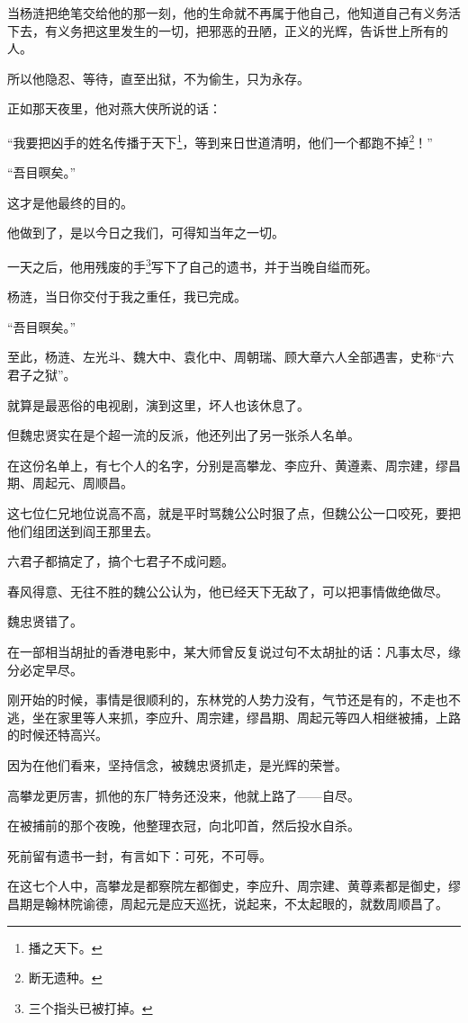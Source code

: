 \begin{multicols}{\theparacolNo}
当杨涟把绝笔交给他的那一刻，他的生命就不再属于他自己，他知道自己有义务活下去，有义务把这里发生的一切，把邪恶的丑陋，正义的光辉，告诉世上所有的人。

所以他隐忍、等待，直至出狱，不为偷生，只为永存。

正如那天夜里，他对燕大侠所说的话：

“我要把凶手的姓名传播于天下\footnote{播之天下。}，等到来日世道清明，他们一个都跑不掉\footnote{断无遗种。}！”

“吾目暝矣。”

这才是他最终的目的。

他做到了，是以今日之我们，可得知当年之一切。

一天之后，他用残废的手\footnote{三个指头已被打掉。}写下了自己的遗书，并于当晚自缢而死。

杨涟，当日你交付于我之重任，我已完成。

“吾目暝矣。”

至此，杨涟、左光斗、魏大中、袁化中、周朝瑞、顾大章六人全部遇害，史称“六君子之狱”。

就算是最恶俗的电视剧，演到这里，坏人也该休息了。

但魏忠贤实在是个超一流的反派，他还列出了另一张杀人名单。

在这份名单上，有七个人的名字，分别是高攀龙、李应升、黄遵素、周宗建，缪昌期、周起元、周顺昌。

这七位仁兄地位说高不高，就是平时骂魏公公时狠了点，但魏公公一口咬死，要把他们组团送到阎王那里去。

六君子都搞定了，搞个七君子不成问题。

春风得意、无往不胜的魏公公认为，他已经天下无敌了，可以把事情做绝做尽。

魏忠贤错了。

在一部相当胡扯的香港电影中，某大师曾反复说过句不太胡扯的话：凡事太尽，缘分必定早尽。

刚开始的时候，事情是很顺利的，东林党的人势力没有，气节还是有的，不走也不逃，坐在家里等人来抓，李应升、周宗建，缪昌期、周起元等四人相继被捕，上路的时候还特高兴。

因为在他们看来，坚持信念，被魏忠贤抓走，是光辉的荣誉。

高攀龙更厉害，抓他的东厂特务还没来，他就上路了——自尽。

在被捕前的那个夜晚，他整理衣冠，向北叩首，然后投水自杀。

死前留有遗书一封，有言如下：可死，不可辱。

在这七个人中，高攀龙是都察院左都御史，李应升、周宗建、黄尊素都是御史，缪昌期是翰林院谕德，周起元是应天巡抚，说起来，不太起眼的，就数周顺昌了。


\end{multicols}

